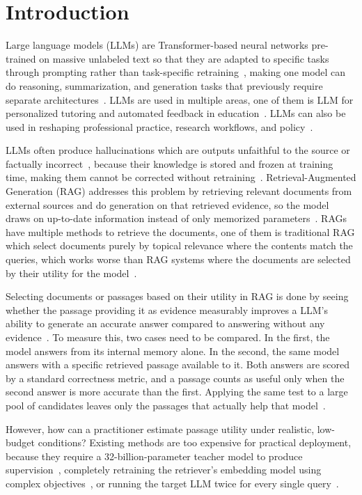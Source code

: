 \documentclass[conference]{IEEEtran}
\begin{document}
\section{Introduction}
Large language models (LLMs) are Transformer-based neural networks pre-trained on massive unlabeled text so that they are adapted to specific tasks through prompting rather than task-specific retraining~\cite{min2023}, making one model can do reasoning, summarization, and generation tasks that previously require separate architectures~\cite{chang2024}. LLMs are used in multiple areas, one of them is LLM for personalized tutoring and automated feedback in education~\cite{kasneci2023}. LLMs can also be used in reshaping professional practice, research workflows, and policy~\cite{dwivedi2023}.

LLMs often produce hallucinations which are outputs unfaithful to the source or factually incorrect~\cite{ji2023}, because their knowledge is stored and frozen at training time, making them cannot be corrected without retraining~\cite{huang2025}. Retrieval-Augmented Generation (RAG) addresses this problem by retrieving relevant documents from external sources and do generation on that retrieved evidence, so the model draws on up-to-date information instead of only memorized parameters~\cite{fan2024}. RAGs have multiple methods to retrieve the documents, one of them is traditional RAG which select documents purely by topical relevance where the contents match the queries, which works worse than RAG systems where the documents are selected by their utility for the model~\cite{zhang2026}.

Selecting documents or passages based on their utility in RAG is done by seeing whether the passage providing it as evidence measurably improves a LLM's ability to generate an accurate answer compared to answering without any evidence~\cite{zhang2026}. To measure this, two cases need to be compared. In the first, the model answers from its internal memory alone. In the second, the same model answers with a specific retrieved passage available to it. Both answers are scored by a standard correctness metric, and a passage counts as useful only when the second answer is more accurate than the first. Applying the same test to a large pool of candidates leaves only the passages that actually help that model~\cite{zhang2026}.

However, how can a practitioner estimate passage utility under realistic, low-budget conditions? Existing methods are too expensive for practical deployment, because they require a 32-billion-parameter teacher model to produce supervision~\cite{zhang2025b}, completely retraining the retriever's embedding model using complex objectives~\cite{sandhu2026}, or running the target LLM twice for every single query~\cite{zhang2025c}.
\end{document}
